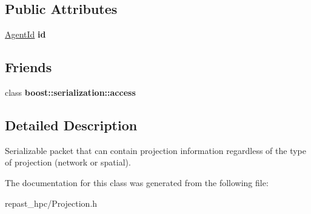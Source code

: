 \subsection*{Public Attributes}
\begin{DoxyCompactItemize}
\item 
\hypertarget{classrepast_1_1_projection_info_packet_ae68c1d9e0a767a560546729f59a22307}{\hyperlink{classrepast_1_1_agent_id}{Agent\-Id} {\bfseries id}}\label{classrepast_1_1_projection_info_packet_ae68c1d9e0a767a560546729f59a22307}

\end{DoxyCompactItemize}
\subsection*{Friends}
\begin{DoxyCompactItemize}
\item 
\hypertarget{classrepast_1_1_projection_info_packet_ac98d07dd8f7b70e16ccb9a01abf56b9c}{class {\bfseries boost\-::serialization\-::access}}\label{classrepast_1_1_projection_info_packet_ac98d07dd8f7b70e16ccb9a01abf56b9c}

\end{DoxyCompactItemize}


\subsection{Detailed Description}
Serializable packet that can contain projection information regardless of the type of projection (network or spatial). 

The documentation for this class was generated from the following file\-:\begin{DoxyCompactItemize}
\item 
repast\-\_\-hpc/Projection.\-h\end{DoxyCompactItemize}
